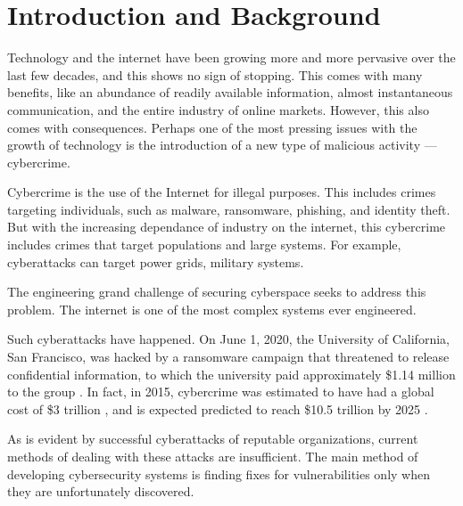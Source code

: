 \section{Introduction and Background}
Technology and the internet have been growing more and more pervasive over the last few decades, and this shows no sign of stopping.
This comes with many benefits, like an abundance of readily available information, almost instantaneous communication, and the entire industry of online markets.
However, this also comes with consequences.
Perhaps one of the most pressing issues with the growth of technology is the introduction of a new type of malicious activity --- cybercrime.

Cybercrime is the use of the Internet for illegal purposes.
This includes crimes targeting individuals, such as malware, ransomware, phishing, and identity theft.
But with the increasing dependance of industry on the internet, this cybercrime includes crimes that target populations and large systems.
For example, cyberattacks can target power grids, military systems.

The engineering grand challenge of securing cyberspace seeks to address this problem.
The internet is one of the most complex systems ever engineered.

Such cyberattacks have happened.
On June 1, 2020, the University of California, San Francisco, was hacked by a ransomware campaign that threatened to release confidential information, to which the university paid approximately \$1.14 million to the group \cite{winder2020}.
In fact, in 2015, cybercrime was estimated to have had a global cost of \$3 trillion \cite{microsoft2016}, and is expected predicted to reach \$10.5 trillion by 2025 \cite{morgan2020}.

As is evident by successful cyberattacks of reputable organizations, current methods of dealing with these attacks are insufficient.
The main method of developing cybersecurity systems is finding fixes for vulnerabilities only when they are unfortunately discovered.
